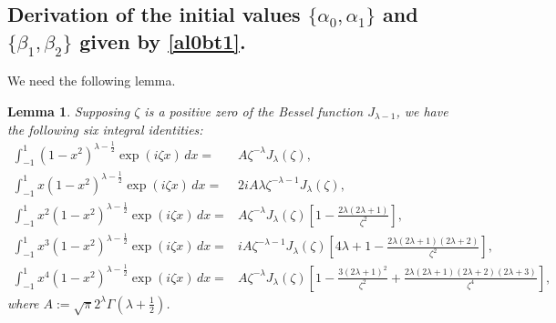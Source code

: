 \documentclass[11pt,a4paper]{article}
\newtheorem{lemma}[theorem]{Lemma}
\numberwithin{equation}{section}
\begin{document}
{\small \begin{appendices}

\section{Derivation of the initial values $\{\alpha_0,\alpha_1\}$ and $\{ \beta_1,\beta_2\}$ given by \eqref{al0bt1}.}\label{J0D-int-1}
We need the following lemma.
\begin{lemma}\label{w1L}
Supposing $\zeta$ is a positive zero of the Bessel function $J_{\lambda-1}$, we have the following six integral identities:
\begin{align}
\int_{-1}^{1}(1-x^2)^{\lambda-\frac{1}{2}}\exp(\mathit{i}\zeta x)\, dx=&A\zeta^{-\lambda}J_{\lambda}(\zeta),\label{Bs-1-1}\\
\int_{-1}^{1}x(1-x^2)^{\lambda-\frac{1}{2}}\exp(\mathit{i}\zeta x)\, dx=&2i A\lambda\zeta^{-\lambda-1}J_{\lambda}(\zeta),\label{Bs-1-2}\\
\int_{-1}^{1}x^{2}(1-x^2)^{\lambda-\frac{1}{2}}\exp(\mathit{i}\zeta x)\, dx=&A\zeta^{-\lambda}J_{\lambda}(\zeta)\left[1-\frac{2\lambda(2\lambda+1)}{\zeta^2}\right],\label{Bs-1-3}\\
\int_{-1}^{1}x^{3}(1-x^2)^{\lambda-\frac{1}{2}}\exp(\mathit{i}\zeta x)\, dx=&iA\zeta^{-\lambda-1}J_{\lambda}(\zeta)\left[4\lambda+1-\frac{2\lambda(2\lambda+1)(2\lambda+2)}{\zeta^2}\right],\label{Bs-1-4}\\
\int_{-1}^{1}x^{4}(1-x^2)^{\lambda-\frac{1}{2}}\exp(\mathit{i}\zeta x)\, dx=&A\zeta^{-\lambda}J_{\lambda}(\zeta)\left[1-\frac{3(2\lambda+1)^2}{\zeta^2}+\frac{2\lambda(2\lambda+1)(2\lambda+2)(2\lambda+3)}{\zeta^4}\right],\label{Bs-1-5}
\end{align}
where $A:=\sqrt{\pi}2^{\lambda}\Gamma\left(\lambda+\frac{1}{2}\right)$.
\end{lemma}


\end{appendices}}
\end{document}
